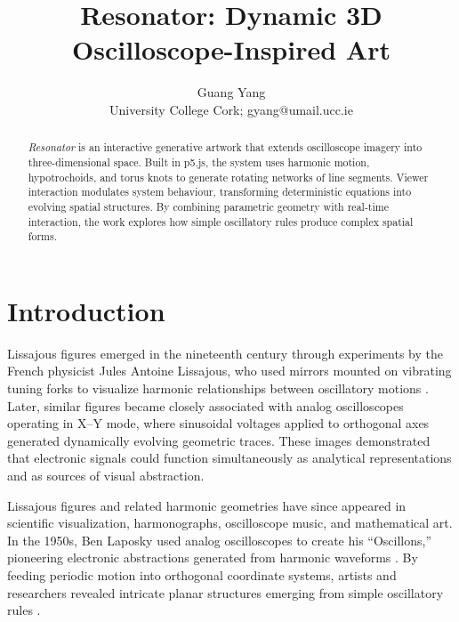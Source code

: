 \documentclass[letterpaper,11pt]{article}
\title{Resonator: Dynamic 3D Oscilloscope-Inspired Art}
\author{Guang Yang\\
University College Cork; gyang@umail.ucc.ie}
\date{}
\begin{document}
\maketitle
\thispagestyle{empty}

\begin{abstract}

\emph{Resonator} is an interactive generative artwork that extends oscilloscope imagery into three-dimensional space. Built in p5.js, the system uses harmonic motion, hypotrochoids, and torus knots to generate rotating networks of line segments. Viewer interaction modulates system behaviour, transforming deterministic equations into evolving spatial structures. By combining parametric geometry with real-time interaction, the work explores how simple oscillatory rules produce complex spatial forms.

\end{abstract}


\section*{Introduction}

Lissajous figures emerged in the nineteenth century through experiments by the French physicist Jules Antoine Lissajous, who used mirrors mounted on vibrating tuning forks to visualize harmonic relationships between oscillatory motions \cite{sierra2023recurrence}. Later, similar figures became closely associated with analog oscilloscopes operating in X--Y mode, where sinusoidal voltages applied to orthogonal axes generated dynamically evolving geometric traces. These images demonstrated that electronic signals could function simultaneously as analytical representations and as sources of visual abstraction.

Lissajous figures and related harmonic geometries have since appeared in scientific visualization, harmonographs, oscilloscope music, and mathematical art. In the 1950s, Ben Laposky used analog oscilloscopes to create his ``Oscillons,'' pioneering electronic abstractions generated from harmonic waveforms \cite{laposky1953electronic}. By feeding periodic motion into orthogonal coordinate systems, artists and researchers revealed intricate planar structures emerging from simple oscillatory rules \cite{grimsey2009lissajous,sierra2023recurrence}.
\end{document}
